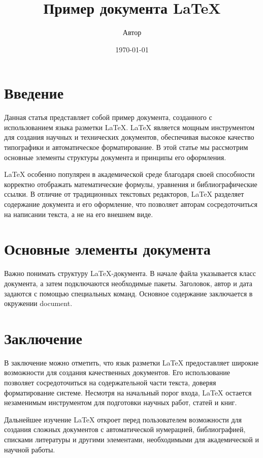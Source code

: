\documentclass{article}
\title{Пример документа LaTeX}
\author{Автор}
\date{\today}
\begin{document}
\maketitle

\section{Введение}
Данная статья представляет собой пример документа, созданного с использованием языка разметки LaTeX. LaTeX является мощным инструментом для создания научных и технических документов, обеспечивая высокое качество типографики и автоматическое форматирование. В этой статье мы рассмотрим основные элементы структуры документа и принципы его оформления.

LaTeX особенно популярен в академической среде благодаря своей способности корректно отображать математические формулы, уравнения и библиографические ссылки. В отличие от традиционных текстовых редакторов, LaTeX разделяет содержание документа и его оформление, что позволяет авторам сосредоточиться на написании текста, а не на его внешнем виде.

\section{Основные элементы документа}
Важно понимать структуру LaTeX-документа. В начале файла указывается класс документа, а затем подключаются необходимые пакеты. Заголовок, автор и дата задаются с помощью специальных команд. Основное содержание заключается в окружении document.

\section{Заключение}
В заключение можно отметить, что язык разметки LaTeX предоставляет широкие возможности для создания качественных документов. Его использование позволяет сосредоточиться на содержательной части текста, доверяя форматирование системе. Несмотря на начальный порог входа, LaTeX остается незаменимым инструментом для подготовки научных работ, статей и книг.

Дальнейшее изучение LaTeX откроет перед пользователем возможности для создания сложных документов с автоматической нумерацией, библиографией, списками литературы и другими элементами, необходимыми для академической и научной работы.
\end{document}
